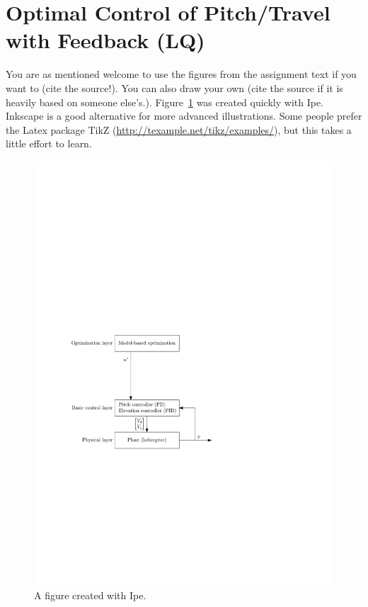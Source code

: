 \section{Optimal Control of Pitch/Travel with Feedback (LQ)}\label{sec:prob3}
You are as mentioned welcome to use the figures from the assignment text if you want to (cite the source!). You can also draw your own (cite the source if it is heavily based on someone else's.). Figure~\ref{fig:layers_openloop} was created quickly with Ipe. Inkscape is a good alternative for more advanced illustrations. Some people prefer the Latex package TikZ (\url{http://texample.net/tikz/examples/}), but this takes a little effort to learn.

\begin{figure}[tp]
	\centering
		\includegraphics[width=1.00\textwidth]{figures/layers_openloop.pdf}
	\caption{A figure created with Ipe.}
	\label{fig:layers_openloop}
\end{figure}

